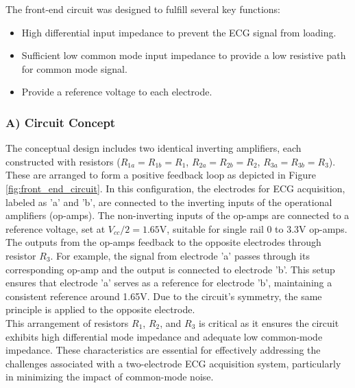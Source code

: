 \noindent The front-end circuit was designed to fulfill several key functions:
\begin{itemize}
	\item High differential input impedance to prevent the ECG signal from loading.
	\item Sufficient low common mode input impedance to provide a low resistive path for common mode signal.
	\item Provide a reference voltage to each electrode.
\end{itemize}



\subsubsection*{A) Circuit Concept}

The conceptual design includes two identical inverting amplifiers, each constructed with resistors ($R_{1a} = R_{1b} = R_1$, $R_{2a} = R_{2b} = R_2$, $R_{3a} = R_{3b} = R_3$). These are arranged to form a positive feedback loop as depicted in Figure \ref{fig:front_end_circuit}. In this configuration, the electrodes for ECG acquisition, labeled as 'a' and 'b', are connected to the inverting inputs of the operational amplifiers (op-amps). The non-inverting inputs of the op-amps are connected to a reference voltage, set at $V_{cc}/2 = 1.65$V, suitable for single rail 0 to 3.3V op-amps.\\

\noindent The outputs from the op-amps feedback to the opposite electrodes through resistor $R_3$. For example, the signal from electrode 'a' passes through its corresponding op-amp and the output is connected to electrode 'b'. This setup ensures that electrode 'a' serves as a reference for electrode 'b', maintaining a consistent reference around 1.65V. Due to the circuit’s symmetry, the same principle is applied to the opposite electrode.\\

\noindent This arrangement of resistors $R_1$, $R_2$, and $R_3$ is critical as it ensures the circuit exhibits high differential mode impedance and adequate low common-mode impedance. These characteristics are essential for effectively addressing the challenges associated with a two-electrode ECG acquisition system, particularly in minimizing the impact of common-mode noise.

